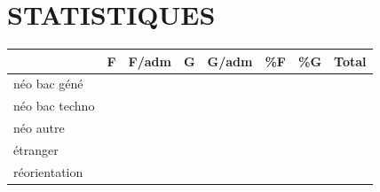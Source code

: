 \documentclass{article}%
\begin{document}
\section*{STATISTIQUES}%
\label{sec:STATISTIQUES}%
\begin{tabular}{|p{1.5cm}|p{1.5cm}|p{1.5cm}|p{1.5cm}|p{1.5cm}|p{1.5cm}|p{1.5cm}|p{1.5cm}|}%
\hline%
&F&F/adm&G&G/adm&\%F&\%G&Total\\%
\hline%
néo bac géné&&&&&&&\\%
\hline%
néo bac techno&&&&&&&\\%
\hline%
néo autre&&&&&&&\\%
\hline%
étranger&&&&&&&\\%
\hline%
réorientation&&&&&&&\\%
\hline%
\end{tabular}

%
\end{document}
